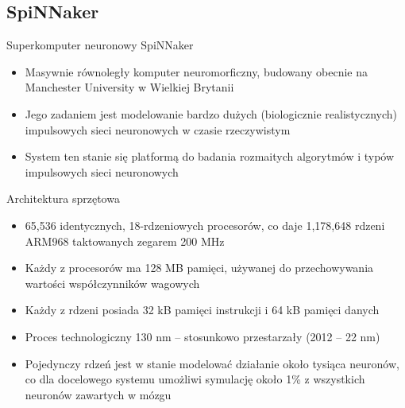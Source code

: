 \documentclass{beamer}
\begin{document}
\subsection{SpiNNaker}

\begin{frame}{Superkomputer neuronowy SpiNNaker}

\begin{itemize}

\item Masywnie równoległy komputer neuromorficzny, budowany obecnie na Manchester University w Wielkiej Brytanii

\item Jego zadaniem jest modelowanie bardzo dużych (biologicznie realistycznych) impulsowych sieci neuronowych w czasie rzeczywistym

\item System ten stanie się platformą do badania rozmaitych algorytmów i typów impulsowych sieci neuronowych

\end{itemize}

\end{frame}

\begin{frame}{Architektura sprzętowa}

\begin{itemize}

\item 65,536 identycznych, 18-rdzeniowych procesorów, co daje 1,178,648 rdzeni ARM968 taktowanych zegarem 200 MHz
\item Każdy z procesorów ma 128 MB pamięci, używanej do przechowywania wartości współczynników wagowych
\item Każdy z rdzeni posiada 32 kB pamięci instrukcji i 64 kB pamięci danych
\item Proces technologiczny 130 nm -- stosunkowo przestarzały (2012 -- 22 nm)
\item Pojedynczy rdzeń jest w stanie modelować działanie około tysiąca neuronów, co dla docelowego systemu umożliwi symulację około 1\% z wszystkich neuronów zawartych w mózgu

\end{itemize}


\end{frame}
\end{document}
